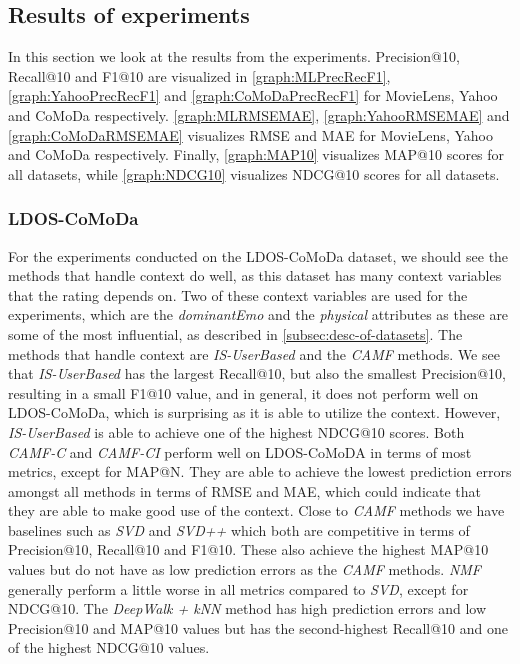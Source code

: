 \subsection{Results of experiments}\label{subsec:resultsofexperiment}
In this section we look at the results from the experiments.
Precision@10, Recall@10 and F1@10 are visualized in \autoref{graph:MLPrecRecF1}, \autoref{graph:YahooPrecRecF1} and \autoref{graph:CoMoDaPrecRecF1} for MovieLens, Yahoo and CoMoDa respectively.
\autoref{graph:MLRMSEMAE}, \autoref{graph:YahooRMSEMAE} and \autoref{graph:CoMoDaRMSEMAE} visualizes RMSE and MAE for MovieLens, Yahoo and CoMoDa respectively.
Finally, \autoref{graph:MAP10} visualizes MAP@10 scores for all datasets, while \autoref{graph:NDCG10} visualizes NDCG@10 scores for all datasets.
\subsubsection{LDOS-CoMoDa}
For the experiments conducted on the LDOS-CoMoDa dataset, we should see the methods that handle context do well, as this dataset has many context variables that the rating depends on.
Two of these context variables are used for the experiments, which are the \textit{dominantEmo} and the \textit{physical} attributes as these are some of the most influential, as described in \autoref{subsec:desc-of-datasets}.
The methods that handle context are \textit{IS-UserBased} and the \textit{CAMF} methods.
We see that \textit{IS-UserBased} has the largest Recall@10, but also the smallest Precision@10, resulting in a small F1@10 value, and in general, it does not perform well on LDOS-CoMoDa, which is surprising as it is able to utilize the context.
However, \textit{IS-UserBased} is able to achieve one of the highest NDCG@10 scores.
Both \textit{CAMF-C} and \textit{CAMF-CI} perform well on LDOS-CoMoDA in terms of most metrics, except for MAP@N.
They are able to achieve the lowest prediction errors amongst all methods in terms of RMSE and MAE, which could indicate that they are able to make good use of the context.
Close to \textit{CAMF} methods we have baselines such as \textit{SVD} and \textit{SVD++} which both are competitive in terms of Precision@10, Recall@10 and F1@10. 
These also achieve the highest MAP@10 values but do not have as low prediction errors as the \textit{CAMF} methods.
\textit{NMF} generally perform a little worse in all metrics compared to \textit{SVD}, except for NDCG@10.
The \textit{DeepWalk + kNN} method has high prediction errors and low Precision@10 and MAP@10 values but has the second-highest Recall@10 and one of the highest NDCG@10 values.
